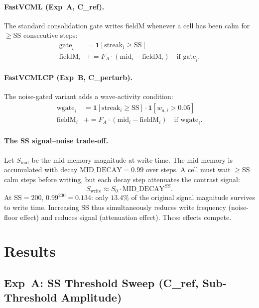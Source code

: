 \documentclass[11pt,a4paper]{article}
\begin{document}
\paragraph{FastVCML (Exp~A, C\_ref).}
The standard consolidation gate writes fieldM whenever a cell has been calm
for $\geq \mathrm{SS}$ consecutive steps:
\begin{align}
  \text{gate}_i &= \mathbf{1}[\mathrm{streak}_i \geq \mathrm{SS}] \\
  \mathrm{fieldM}_i &\mathrel{+}= F_A \cdot (\mathrm{mid}_i - \mathrm{fieldM}_i)
    \quad \text{if } \mathrm{gate}_i.
\end{align}

\paragraph{FastVCMLCP (Exp~B, C\_perturb).}
The noise-gated variant adds a wave-activity condition:
\begin{align}
  \text{wgate}_i &= \mathbf{1}[\mathrm{streak}_i \geq \mathrm{SS}] \cdot \mathbf{1}[w_{a,i} > 0.05] \\
  \mathrm{fieldM}_i &\mathrel{+}= F_A \cdot (\mathrm{mid}_i - \mathrm{fieldM}_i)
    \quad \text{if } \mathrm{wgate}_i.
\end{align}

\paragraph{The SS signal--noise trade-off.}
Let $S_\mathrm{mid}$ be the mid-memory magnitude at write time.
The mid memory is accumulated with decay $\mathrm{MID\_DECAY}=0.99$ over steps.
A cell must wait $\geq \mathrm{SS}$ calm steps before writing, but each decay step
attenuates the contrast signal:
\begin{equation}
  S_\mathrm{write} \approx S_0 \cdot \mathrm{MID\_DECAY}^{SS}.
\end{equation}
At $\mathrm{SS}=200$, $0.99^{200}=0.134$: only $13.4\%$ of the original
signal magnitude survives to write time. Increasing SS thus simultaneously
reduces write frequency (noise-floor effect) and reduces signal (attenuation
effect). These effects compete.

\section{Results}

\subsection{Exp~A: SS Threshold Sweep (C\_ref, Sub-Threshold Amplitude)}
\end{document}

